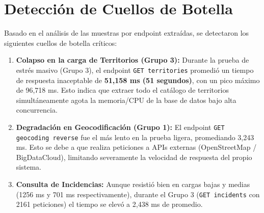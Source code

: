 \section{Detección de Cuellos de Botella}
Basado en el análisis de las muestras por endpoint extraídas, se detectaron los siguientes cuellos de botella críticos:
\begin{enumerate}
    \item \textbf{Colapso en la carga de Territorios (Grupo 3):} 
    Durante la prueba de estrés masivo (Grupo 3), el endpoint \texttt{GET territories} promedió un tiempo de respuesta inaceptable de \textbf{51,158 ms (51 segundos)}, con un pico máximo de 96,718 ms. Esto indica que extraer todo el catálogo de territorios simultáneamente agota la memoria/CPU de la base de datos bajo alta concurrencia.
    
    \item \textbf{Degradación en Geocodificación (Grupo 1):}
    El endpoint \texttt{GET geocoding reverse} fue el más lento en la prueba ligera, promediando 3,243 ms. Esto se debe a que realiza peticiones a APIs externas (OpenStreetMap / BigDataCloud), limitando severamente la velocidad de respuesta del propio sistema.
    
    \item \textbf{Consulta de Incidencias:}
    Aunque resistió bien en cargas bajas y medias (1256 ms y 701 ms respectivamente), durante el Grupo 3 (\texttt{GET incidents} con 2161 peticiones) el tiempo se elevó a 2,438 ms de promedio.
\end{enumerate}
